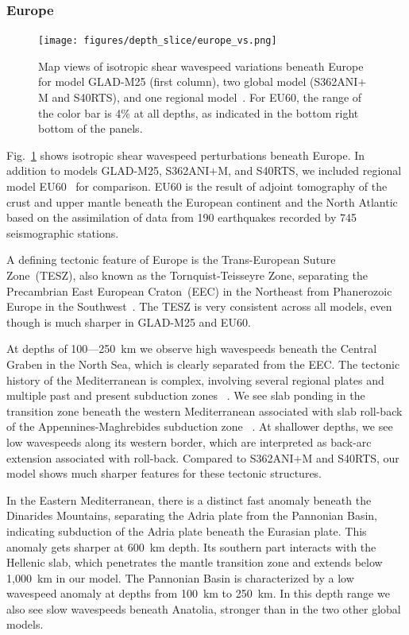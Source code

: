 \documentclass[extra,mreferee]{gji}
\begin{document}
\subsubsection{Europe}

\begin{figure}[ht!]
\texttt{[image: figures/depth\_slice/europe\_vs.png]}
  \caption{\small{Map views of isotropic shear wavespeed variations beneath Europe for model GLAD-M25 (first column), two global model (S362ANI$+$M and S40RTS), and
  one regional model~\citep[EU60;][]{zhu2015seismic}. For EU60, the range of the color
  bar is 4\% at all depths, as indicated in the bottom right bottom of the panels.}}
\label{fig:europe-vs}
\centering
\end{figure}

Fig.~\ref{fig:europe-vs} shows isotropic shear wavespeed perturbations beneath Europe.
In addition to models GLAD-M25, S362ANI$+$M, and S40RTS, we included regional
model EU60~\citep{zhu2015seismic} for comparison.
EU60 is the result of adjoint tomography of the crust and upper mantle
beneath the European continent and the North Atlantic based on the assimilation of data from
190 earthquakes recorded by 745 seismographic stations.

A defining tectonic feature of Europe is the Trans-European Suture Zone~(TESZ),
also known as the Tornquist-Teisseyre Zone,
separating the Precambrian East European Craton~(EEC) in the Northeast from
Phanerozoic Europe in the Southwest~\citep{zielhuis1994deep}.
The TESZ is very consistent across all models,
even though is much sharper in GLAD-M25 and EU60.

At depths of 100---250~km we observe high wavespeeds beneath the Central Graben
in the North Sea, which is clearly separated from the EEC.
The tectonic history of the Mediterranean is complex,
involving several regional plates and multiple past and present subduction zones
~\citep{dewey1989kinematics}.
We see slab ponding in the transition zone beneath the western Mediterranean
associated with slab roll-back of the Appennines-Maghrebides subduction zone
~\citep{wortel2000subduction, zhu2012structure}.
At shallower depths, we see low wavespeeds along its western border,
which are interpreted as back-arc extension associated with  roll-back.
Compared to S362ANI$+$M and S40RTS,
our model shows much sharper features for these tectonic structures.

In the Eastern Mediterranean, there is a distinct fast anomaly beneath the 
Dinarides Mountains, separating the Adria plate from the Pannonian Basin,
indicating subduction of the Adria plate beneath the Eurasian plate.
This anomaly gets sharper at 600~km depth.
Its southern part interacts with the Hellenic slab, which penetrates the mantle
transition zone and extends below 1,000~km in our model.
The Pannonian Basin is characterized by a low wavespeed
anomaly at depths from 100~km to 250~km.
In this depth range we also see slow wavespeeds beneath Anatolia,
stronger than in the two other global models.
\end{document}
